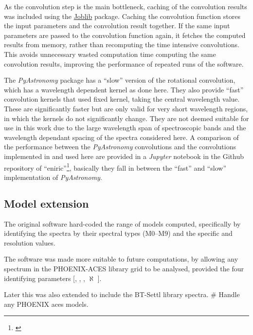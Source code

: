 As the convolution step is the main bottleneck, caching of the convolution results was included using the \href{https://joblib.readthedocs.io}{Joblib} package.
Caching the convolution function stores the input parameters and the convolution result together.
If the same input parameters are passed to the convolution function again, it fetches the computed results from memory, rather than recomputing the time intensive convolutions.
This avoids unnecessary wasted computation time computing the same convolution results, improving the performance of repeated runs of the software.

The \emph{PyAstronomy} package has a ``slow'' version of the rotational convolution, which has a wavelength dependent kernel as done here.
They also provide ``fast'' convolution kernels that used fixed kernel, taking the central wavelength value.
These are significantly faster but are only valid for very short wavelength regions, in which the kernels do not significantly change.
They are not deemed suitable for use in this work due to the large wavelength span of spectroscopic bands and the wavelength dependant spacing of the spectra considered here.
A comparison of the performance between the \emph{PyAstronomy} convolutions and the convolutions implemented in \eniric{} and used here are provided in a \emph{Jupyter} notebook in the Github repository of ``eniric''\footnote{\href{https://github.com/jason-neal/eniric/blob/master/docs/Notebooks/Convolution_speeds.ipynb}{}}, basically they fall in between the ``fast'' and ``slow'' implementation of \emph{PyAstronomy}.



\subsection{Model extension}
\label{subsec:eniric_model_extesion}
The original software hard-coded the range of models computed, specifically by identifying the spectra by their spectral types (M0--M9) and the specific \Vsini{} and resolution values.

The software was made more suitable to future computations, by allowing any spectrum in the {PHOENIX-ACES} library grid to be analysed, provided the four identifying parameters [\Teff, \Logg, \feh{}, $\aleph$ \alphafe{}]. 

Later this was also extended to include the {BT-Settl} library spectra.
\# Handle any {PHOENIX} aces models.


